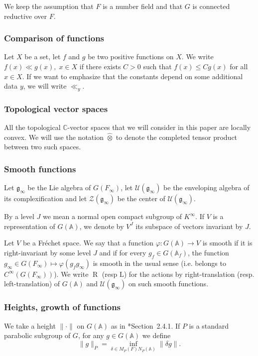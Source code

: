 \documentclass[letterpaper,11pt]{amsart}
\newcommand{\fg}{\mathfrak{g}}
\newcommand{\bA}{\mathbb{A}}
\newcommand{\C}{\mathbb{C}}
\newcommand{\cU}{\mathcal{U}}
\newcommand{\cZ}{\mathcal{Z}}
\newcommand{\<}{\negthickspace}
\providecommand{\aabs}[1]{\lVert#1\rVert}
\DeclareMathOperator{\rR}{R}
\theoremstyle{definition}
\theoremstyle{plain}
\theoremstyle{remark}
\numberwithin{equation}{section}
\begin{document}
We keep the assumption that $F$ is a number field and that $G$ is connected reductive over $F$. 

\subsubsection{Comparison of functions}
\label{subsubsec:functions_comp}

Let $X$ be a set, let $f$ and $g$ be two positive functions on $X$. We write $f(x) \ll g(x), \; x \in X$ if there exists $C>0$ such that $f(x) \leq C g(x)$ for all $x \in X$. If we want to emphasize that the constants depend on some additional data $y$, we will write $\ll_y$.

\subsubsection{Topological vector spaces} All the topological $\C$-vector spaces that we will consider in this paper are locally convex. We will use the notation $\widehat{\otimes}$ to denote the completed tensor product between two such spaces.

\subsubsection{Smooth functions} Let $\fg_\infty$ be the Lie algebra of $G(F_\infty)$, let $\cU(\fg_\infty)$ be the enveloping algebra of its complexification and let $\cZ(\fg_\infty)$ be the center of $\cU(\fg_\infty)$. 

By a level $J$ we mean a normal open compact subgroup of $K^\infty$. If $V$ is a representation of $G(\bA)$, we denote by $V^J$ its subspace of vectors invariant by $J$.

Let $V$ be a Fréchet space. We say that a function $\varphi : G(\bA) \to V$ is smooth if it is right-invariant by some level $J$ and if for every $g_f \in G(\bA_f)$, the function $g_\infty \in G(F_\infty) \mapsto \varphi(g_f g_\infty)$ is smooth in the usual sense (i.e. belongs to $C^\infty(G(F_\infty))$). We write $\rR$ (resp $\mathrm{L}$) for the actions by right-translation (resp. left-translation) of $G(\bA)$ and $\cU(\fg_\infty)$ on such smooth functions.


\subsubsection{Heights, growth of functions} \label{subsec:heights} We take a height $\aabs{\cdot}$ on $G(\bA)$ as in \cite{BPCZ}*{Section~2.4.1}. If $P$ is a standard parabolic subgroup of $G$, for any $g \in G(\bA)$ we define
\begin{equation*}
    \aabs{g}_P= \inf_{\delta \in M_P(F) N_P(\bA)} \aabs{\delta g}.
\end{equation*}
\end{document}
